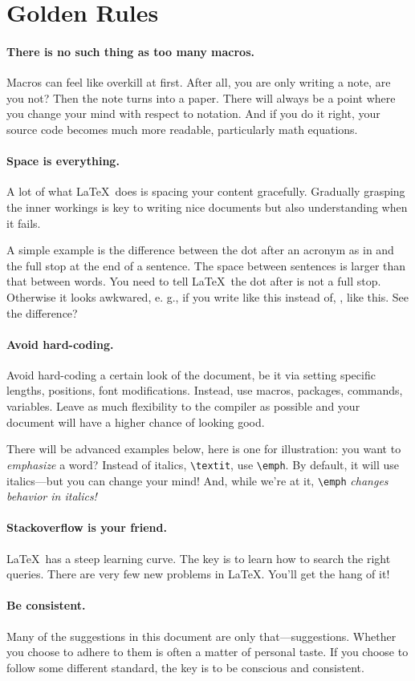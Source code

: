 \section{Golden Rules}

\paragraph{There is no such thing as too many macros.} 
Macros can feel like overkill at first.
After all, you are only writing a note, are you not?
Then the note turns into a paper.
There will always be a point where you change your mind with respect to notation.
And if you do it right, your source code becomes much more readable, particularly math equations.

\paragraph{Space is everything.}
A lot of what \LaTeX\ does is spacing your content gracefully.
Gradually grasping the inner workings is key to writing nice documents but also understanding when it fails.

A simple example is the difference between the dot after an acronym as in \etc and the full stop at the end of a sentence.
The space between sentences is larger than that between words.
You need to tell \LaTeX\ the dot after \etc is not a full stop.
Otherwise it looks awkwared, e. g., if you write like this instead of, \eg, like this.
See the difference?

\paragraph{Avoid hard-coding.}

Avoid hard-coding a certain look of the document, be it via setting specific lengths, positions, font modifications.
Instead, use macros, packages, commands, variables.
Leave as much flexibility to the compiler as possible and your document will have a higher chance of looking good.

There will be advanced examples below, here is one for illustration: you want to \emph{emphasize} a word?
Instead of italics, \verb|\textit|, use \verb|\emph|.
By default, it will use italics---but you can change your mind! And, while we're at it, \verb|\emph| \textit{changes \emph{behavior} in italics!}

\paragraph{Stackoverflow is your friend.}
\LaTeX\ has a steep learning curve.
The key is to learn how to search the right queries.
There are very few new problems in \LaTeX.
You'll get the hang of it!

\paragraph{Be consistent.}
Many of the suggestions in this document are only that---suggestions.
Whether you choose to adhere to them is often a matter of personal taste.
If you choose to follow some different standard, the key is to be conscious and consistent.